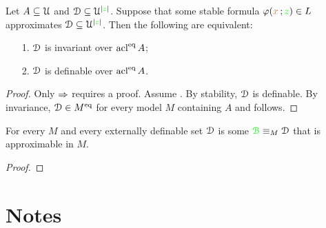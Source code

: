 \documentclass[creche.tex]{subfiles}
\begin{document}
\begin{proposition}
Let $A\subseteq\EuScript U$ and $\EuScript D\subseteq\EuScript U^{|{\color{green} z}|}$. Suppose that some stable formula $\varphi({\color{brown} x}\,;{\color{green} z})\in L$ approximates $\EuScript D\subseteq\EuScript U^{|{\color{green} z}|}$. Then the following are equivalent:
\begin{itemize}
\item[1.] $\EuScript D$ is invariant over $\mathop{\rm acl}^{{\rm eq}} A$;
\item[2.] $\EuScript D$ is definable over $\mathop{\rm acl}^{{\rm eq}} A$.
\end{itemize}
\end{proposition}

\begin{proof}
Only $\Rightarrow$ requires a proof. Assume . By stability, $\EuScript D$ is definable. By invariance, $\EuScript D\in M^{{\rm eq}}$ for every model $M$ containing $A$ and  follows.
\end{proof}


\begin{proposition}
For every $M$ and every externally definable set $\EuScript D$ is some ${\color{green}{\EuScript B}}\equiv_M\EuScript D$ that is approximable in $M$. 
\end{proposition}

\begin{proof}

\end{proof}


\section{Notes}
\begin{biblist}[]\normalsize





\end{biblist}
\end{document}
